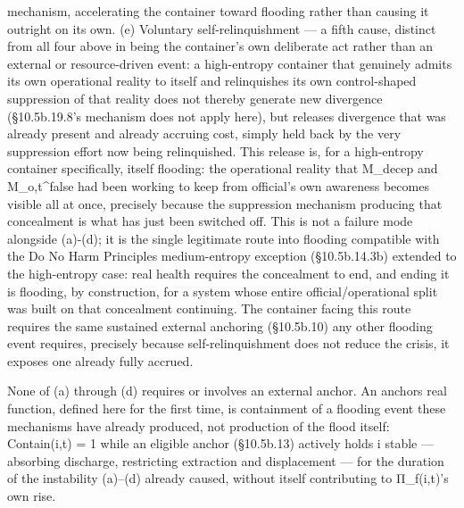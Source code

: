 \documentclass[
]{article}
\begin{document}
mechanism, accelerating the container toward flooding rather than
causing it outright on its own. (e) Voluntary self-relinquishment --- a
fifth cause, distinct from all four above in being the container's own
deliberate act rather than an external or resource-driven event: a
high-entropy container that genuinely admits its own operational reality
to itself and relinquishes its own control-shaped suppression of that
reality does not thereby generate new divergence (§10.5b.19.8's mechanism
does not apply here), but releases divergence that was already present
and already accruing cost, simply held back by the very suppression
effort now being relinquished. This release is, for a high-entropy
container specifically, itself flooding: the operational reality that
M\_decep and M\_o,t\^{}false had been working to keep from official's own
awareness becomes visible all at once, precisely because the suppression
mechanism producing that concealment is what has just been switched off.
This is not a failure mode alongside (a)-(d); it is the single
legitimate route into flooding compatible with the Do No Harm Principles
medium-entropy exception (§10.5b.14.3b) extended to the high-entropy
case: real health requires the concealment to end, and ending it is
flooding, by construction, for a system whose entire
official/operational split was built on that concealment continuing. The
container facing this route requires the same sustained external
anchoring (§10.5b.10) any other flooding event requires, precisely
because self-relinquishment does not reduce the crisis, it exposes one
already fully accrued.

None of (a) through (d) requires or involves an external anchor. An
anchors real function, defined here for the first time, is containment
of a flooding event these mechanisms have already produced, not
production of the flood itself: Contain(i,t) = 1 while an eligible
anchor (§10.5b.13) actively holds i stable --- absorbing discharge,
restricting extraction and displacement --- for the duration of the
instability (a)--(d) already caused, without itself contributing to
Π\_f(i,t)'s own rise.
\end{document}
